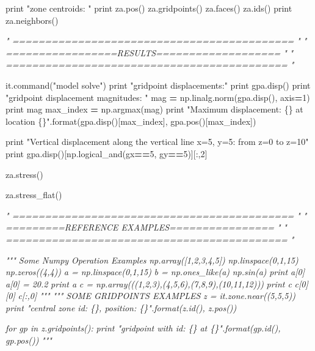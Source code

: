 \documentclass[a4paper, nobind]{templates/ociamthesis}
\newenvironment{Shaded}{\begin{snugshade}}{\end{snugshade}}
\newcommand{\BuiltInTok}[1]{#1}
\newcommand{\CommentTok}[1]{\textcolor[rgb]{0.56,0.35,0.01}{\textit{#1}}}
\newcommand{\DecValTok}[1]{\textcolor[rgb]{0.00,0.00,0.81}{#1}}
\newcommand{\NormalTok}[1]{#1}
\newcommand{\OperatorTok}[1]{\textcolor[rgb]{0.81,0.36,0.00}{\textbf{#1}}}
\newcommand{\SpecialCharTok}[1]{\textcolor[rgb]{0.00,0.00,0.00}{#1}}
\newcommand{\StringTok}[1]{\textcolor[rgb]{0.31,0.60,0.02}{#1}}
\renewenvironment{Shaded}
{
  \vspace{10pt}%
  \begin{snugshade}%
}{%
  \end{snugshade}%
  \vspace{8pt}%
}
\begin{document}
\begin{Shaded}
\begin{Highlighting}[]
\BuiltInTok{print} \StringTok{"zone centroids: "}
\BuiltInTok{print}\NormalTok{ za.pos()}
\NormalTok{za.gridpoints()}
\NormalTok{za.faces()}
\NormalTok{za.ids()}
\BuiltInTok{print}\NormalTok{ za.neighbors()}



\CommentTok{" =========================================== "}
\CommentTok{" =================RESULTS=================== "}
\CommentTok{" =========================================== "}

\NormalTok{it.command(}\StringTok{"model solve"}\NormalTok{)}
\BuiltInTok{print} \StringTok{"gridpoint displacements:"}
\BuiltInTok{print}\NormalTok{ gpa.disp()}
\BuiltInTok{print} \StringTok{"gridpoint displacement magnitudes: "}
\NormalTok{mag }\OperatorTok{=}\NormalTok{ np.linalg.norm(gpa.disp(), axis}\OperatorTok{=}\DecValTok{1}\NormalTok{)}
\BuiltInTok{print}\NormalTok{ mag}
\NormalTok{max\_index }\OperatorTok{=}\NormalTok{ np.argmax(mag)}
\BuiltInTok{print} \StringTok{"Maximum displacement: }\SpecialCharTok{\{\}}\StringTok{ at location }\SpecialCharTok{\{\}}\StringTok{"}\NormalTok{.}\BuiltInTok{format}\NormalTok{(gpa.disp()[max\_index],}
\NormalTok{                                              gpa.pos()[max\_index])}

\BuiltInTok{print} \StringTok{"Vertical displacement along the vertical line x=5, y=5: from z=0 to z=10"}
\BuiltInTok{print}\NormalTok{ gpa.disp()[np.logical\_and(gx}\OperatorTok{==}\DecValTok{5}\NormalTok{, gy}\OperatorTok{==}\DecValTok{5}\NormalTok{)][:,}\DecValTok{2}\NormalTok{]}

\NormalTok{za.stress()}

\NormalTok{za.stress\_flat()}


\CommentTok{" =========================================== "}
\CommentTok{" =========REFERENCE EXAMPLES================ "}
\CommentTok{" =========================================== "}


\CommentTok{""" Some Numpy Operation Examples}
\CommentTok{np.array([1,2,3,4,5])}
\CommentTok{np.linspace(0,1,15)}
\CommentTok{np.zeros((4,4))}
\CommentTok{a = np.linspace(0,1,15)}
\CommentTok{b = np.ones\_like(a)}
\CommentTok{np.sin(a)}
\CommentTok{print a[0]}
\CommentTok{a[0] = 20.2}
\CommentTok{print a}
\CommentTok{c = np.array(((1,2,3),(4,5,6),(7,8,9),(10,11,12)))}
\CommentTok{print c}
\CommentTok{c[0][0]}
\CommentTok{c[:,0]}
\CommentTok{"""}
\CommentTok{""" SOME GRIDPOINTS EXAMPLES}
\CommentTok{z = it.zone.near((5,5,5))}
\CommentTok{print "central zone id: \{\}, position: \{\}".format(z.id(), z.pos())}

\CommentTok{for gp in z.gridpoints():}
\CommentTok{    print "gridpoint with id: \{\} at \{\}".format(gp.id(), gp.pos())}
\CommentTok{"""}
\end{Highlighting}
\end{Shaded}
\end{document}
